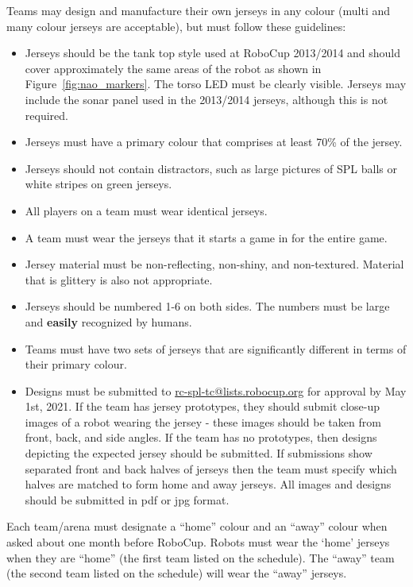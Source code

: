 Teams may design and manufacture their own jerseys in any colour (multi and many colour jerseys are acceptable), but must follow these guidelines:
\begin{itemize}
	\item Jerseys should be the tank top style used at RoboCup 2013/2014 and should cover approximately the same areas of the robot as shown in Figure~\ref{fig:nao_markers}.  The torso LED must be clearly visible.  Jerseys may include the sonar panel used in the 2013/2014 jerseys, although this is not required.
	\item Jerseys must have a primary colour that comprises at least 70\% of the jersey.
	\item Jerseys should not contain distractors, such as large pictures of SPL balls or white stripes on green jerseys.
	\item All players on a team must wear identical jerseys.
	\item A team must wear the jerseys that it starts a game in for the entire game.
	\item Jersey material must be non-reflecting, non-shiny, and non-textured.  Material that is glittery is also not appropriate.
	\item Jerseys should be numbered 1-6 on both sides.  The numbers must be large and {\bf easily} recognized by humans.
	\item Teams must have two sets of jerseys that are significantly different in terms of their primary colour.
	\item Designs must be submitted to \url{rc-spl-tc@lists.robocup.org} for approval by May 1st, 2021. If the team has jersey prototypes, they should submit close-up images of a robot wearing the jersey - these images should be taken from front, back, and side angles.  If the team has no prototypes, then designs depicting the expected jersey should be submitted.  If submissions show separated front and back halves of jerseys then the team must specify which halves are matched to form home and away jerseys.  All images and designs should be submitted in pdf or jpg format.
\end{itemize}

Each team/arena must designate a ``home'' colour and an ``away'' colour when asked about one month before RoboCup. Robots must wear the `home' jerseys when they are ``home'' (the first team listed on the schedule). The ``away'' team (the second team listed on the schedule) will wear the ``away'' jerseys.

